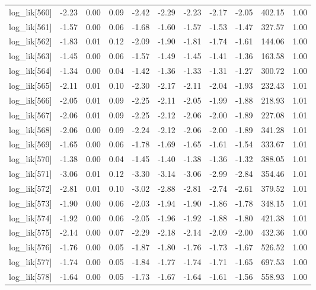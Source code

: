 \begin{table}[ht]
\begin{tabular}{rrrrrrrrrrr}
  log\_lik[560] & -2.23 & 0.00 & 0.09 & -2.42 & -2.29 & -2.23 & -2.17 & -2.05 & 402.15 & 1.00 \\ 
  log\_lik[561] & -1.57 & 0.00 & 0.06 & -1.68 & -1.60 & -1.57 & -1.53 & -1.47 & 327.57 & 1.00 \\ 
  log\_lik[562] & -1.83 & 0.01 & 0.12 & -2.09 & -1.90 & -1.81 & -1.74 & -1.61 & 144.06 & 1.00 \\ 
  log\_lik[563] & -1.45 & 0.00 & 0.06 & -1.57 & -1.49 & -1.45 & -1.41 & -1.36 & 163.58 & 1.00 \\ 
  log\_lik[564] & -1.34 & 0.00 & 0.04 & -1.42 & -1.36 & -1.33 & -1.31 & -1.27 & 300.72 & 1.00 \\ 
  log\_lik[565] & -2.11 & 0.01 & 0.10 & -2.30 & -2.17 & -2.11 & -2.04 & -1.93 & 232.43 & 1.01 \\ 
  log\_lik[566] & -2.05 & 0.01 & 0.09 & -2.25 & -2.11 & -2.05 & -1.99 & -1.88 & 218.93 & 1.01 \\ 
  log\_lik[567] & -2.06 & 0.01 & 0.09 & -2.25 & -2.12 & -2.06 & -2.00 & -1.89 & 227.08 & 1.01 \\ 
  log\_lik[568] & -2.06 & 0.00 & 0.09 & -2.24 & -2.12 & -2.06 & -2.00 & -1.89 & 341.28 & 1.01 \\ 
  log\_lik[569] & -1.65 & 0.00 & 0.06 & -1.78 & -1.69 & -1.65 & -1.61 & -1.54 & 333.67 & 1.01 \\ 
  log\_lik[570] & -1.38 & 0.00 & 0.04 & -1.45 & -1.40 & -1.38 & -1.36 & -1.32 & 388.05 & 1.01 \\ 
  log\_lik[571] & -3.06 & 0.01 & 0.12 & -3.30 & -3.14 & -3.06 & -2.99 & -2.84 & 354.46 & 1.01 \\ 
  log\_lik[572] & -2.81 & 0.01 & 0.10 & -3.02 & -2.88 & -2.81 & -2.74 & -2.61 & 379.52 & 1.01 \\ 
  log\_lik[573] & -1.90 & 0.00 & 0.06 & -2.03 & -1.94 & -1.90 & -1.86 & -1.78 & 348.15 & 1.01 \\ 
  log\_lik[574] & -1.92 & 0.00 & 0.06 & -2.05 & -1.96 & -1.92 & -1.88 & -1.80 & 421.38 & 1.01 \\ 
  log\_lik[575] & -2.14 & 0.00 & 0.07 & -2.29 & -2.18 & -2.14 & -2.09 & -2.00 & 432.36 & 1.00 \\ 
  log\_lik[576] & -1.76 & 0.00 & 0.05 & -1.87 & -1.80 & -1.76 & -1.73 & -1.67 & 526.52 & 1.00 \\ 
  log\_lik[577] & -1.74 & 0.00 & 0.05 & -1.84 & -1.77 & -1.74 & -1.71 & -1.65 & 697.53 & 1.00 \\ 
  log\_lik[578] & -1.64 & 0.00 & 0.05 & -1.73 & -1.67 & -1.64 & -1.61 & -1.56 & 558.93 & 1.00 \\ 

\end{tabular}
\end{table}
